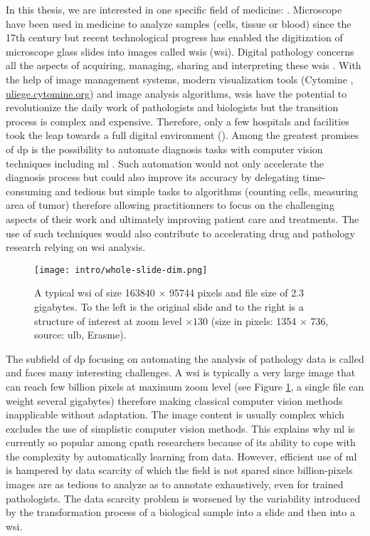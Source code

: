 In this thesis, we are interested in one specific field of medicine: . Microscope have been used in medicine to analyze samples (\eg cells, tissue or blood) since the 17th century \cite{hajdu2002first} but recent technological progress has enabled the digitization of microscope glass slides into images called \acrlong{wsi}s (\acrshort{wsi}). Digital pathology concerns all the aspects of acquiring, managing, sharing and interpreting these \acrshort{wsi}s \cite{doolan2019whatisdp}. With the help of image management systems, modern visualization tools (\eg Cytomine \cite{maree2016collaborative}, \url{uliege.cytomine.org}) and image analysis algorithms, \acrshort{wsi}s have the potential to revolutionize the daily work of pathologists and biologists but the transition process is complex and expensive. Therefore, only a few hospitals and facilities took the leap towards a full digital environment (\eg \cite{stathonikos2013going, eloy2021digital, temprana2022digipatics}). Among the greatest promises of \acrlong{dp} is the possibility to automate diagnosis tasks with computer vision techniques including \acrlong{ml} \cite{ciompi2021editorial}. Such automation would not only accelerate the diagnosis process but could also improve its accuracy by delegating time-consuming and tedious but simple tasks to algorithms (\eg counting cells, measuring area of tumor) therefore allowing practitionners to focus on the challenging aspects of their work and ultimately improving patient care and treatments. The use of such techniques would also contribute to accelerating drug and pathology research relying on \acrlong{wsi} analysis. 

\begin{figure}
  \centering
  \texttt{[image: intro/whole-slide-dim.png]}
  \caption{A typical \acrlong{wsi} of size 163840 $\times$ 95744 pixels and file size of 2.3 gigabytes. To the left is the original slide and to the right is a structure of interest at zoom level $\times130$ (size in pixels: 1354 $\times$ 736, source: \acrshort{ulb}, Erasme).}
  \label{fig:intro:wsi}
\end{figure}

The subfield of \acrlong{dp} focusing on automating the analysis of pathology data is called  and faces many interesting challenges. A \acrshort{wsi} is typically a very large image that can reach few billion pixels at maximum zoom level (see Figure \ref{fig:intro:wsi}, a single file can weight several gigabytes) therefore making classical computer vision methods inapplicable without adaptation. The image content is usually complex which excludes the use of simplistic computer vision methods. This explains why \acrlong{ml} is currently so popular among \acrlong{cpath} researchers because of its ability to cope with the complexity by automatically learning from data. However, efficient use of \acrlong{ml} is hampered by data scarcity of which the field is not spared since billion-pixels images are as tedious to analyze as to annotate exhaustively, even for trained pathologists. The data scarcity problem is worsened by the variability introduced by the transformation process of a biological sample into a slide and then into a \acrlong{wsi}.

